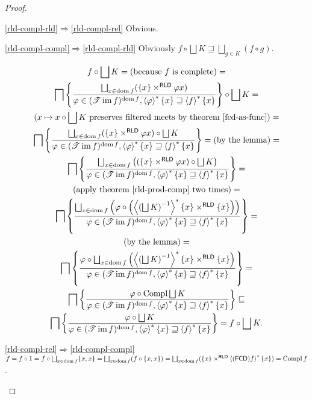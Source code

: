 \begin{proof}
~
\begin{widedisorder}
\item[\ref{rld-compl-rld}$\Rightarrow$\ref{rld-compl-rel}] Obvious.

\item[\ref{rld-compl-compl}$\Rightarrow$\ref{rld-compl-rld}]
Obviously $f\circ\bigsqcup K \sqsupseteq \bigsqcup_{g \in K}(f\circ g)$.

\begin{multline*}
f\circ\bigsqcup K = \text{(because $f$ is complete)} =\\
\bigsqcap\setcond{\bigsqcup_{x\in\dom f}(\{x\}\times^{\mathsf{RLD}}\varphi x)}{\varphi\in(\mathscr{T}\im f)^{\dom f}, \rsupfun{\varphi}\{x\}\sqsupseteq\rsupfun{f}\{x\}}\circ\bigsqcup K =\\
\text{($x\mapsto x\circ\bigsqcup K$ preserves filtered meets by theorem \ref{fcd-as-func})} = \\
\bigsqcap\setcond{\bigsqcup_{x\in\dom f}(\{x\}\times^{\mathsf{RLD}}\varphi x)\circ\bigsqcup K}{\varphi\in(\mathscr{T}\im f)^{\dom f}, \rsupfun{\varphi}\{x\}\sqsupseteq\rsupfun{f}\{x\}} =
\text{(by the lemma)} = \\
\bigsqcap\setcond{\bigsqcup_{x\in\dom f}\left((\{x\}\times^{\mathsf{RLD}}\varphi x)\circ\bigsqcup K\right)}{\varphi\in(\mathscr{T}\im f)^{\dom f}, \rsupfun{\varphi}\{x\}\sqsupseteq\rsupfun{f}\{x\}} =\\
\text{(apply theorem~\ref{rld-prod-comp} two times)} =\\
\bigsqcap\setcond{\bigsqcup_{x\in\dom f}\left(\varphi\circ\left(\rsupfun{\left(\bigsqcup K\right)^{-1}}\{x\}\times^{\mathsf{RLD}}\{x\}\right)\right)}{\varphi\in(\mathscr{T}\im f)^{\dom f}, \rsupfun{\varphi}\{x\}\sqsupseteq\rsupfun{f}\{x\}} =\\
\text{(by the lemma)} = \\
\bigsqcap\setcond{\varphi\circ\bigsqcup_{x\in\dom f}\left(\rsupfun{\left(\bigsqcup K\right)^{-1}}\{x\}\times^{\mathsf{RLD}}\{x\}\right)}{\varphi\in(\mathscr{T}\im f)^{\dom f}, \rsupfun{\varphi}\{x\}\sqsupseteq\rsupfun{f}\{x\}} =\\
\bigsqcap\setcond{\varphi\circ\Compl\bigsqcup K}{\varphi\in(\mathscr{T}\im f)^{\dom f}, \rsupfun{\varphi}\{x\}\sqsupseteq\rsupfun{f}\{x\}} \sqsubseteq\\
\bigsqcap\setcond{\varphi\circ\bigsqcup K}{\varphi\in(\mathscr{T}\im f)^{\dom f}, \rsupfun{\varphi}\{x\}\sqsupseteq\rsupfun{f}\{x\}} =
f\circ\bigsqcup K.
\end{multline*}

\item[\ref{rld-compl-rel}$\Rightarrow$\ref{rld-compl-compl}]
$f = f\circ 1 = f\circ\bigsqcup_{x \in \dom f} \{x,x\} =
\bigsqcup_{x \in \dom f} (f\circ\{x,x\}) = \bigsqcup_{x\in\dom f}(\{x\} \times^{\mathsf{RLD}}\rsupfun{\tofcd f}\{x\}) = \Compl f$.
\end{widedisorder}
\end{proof}

